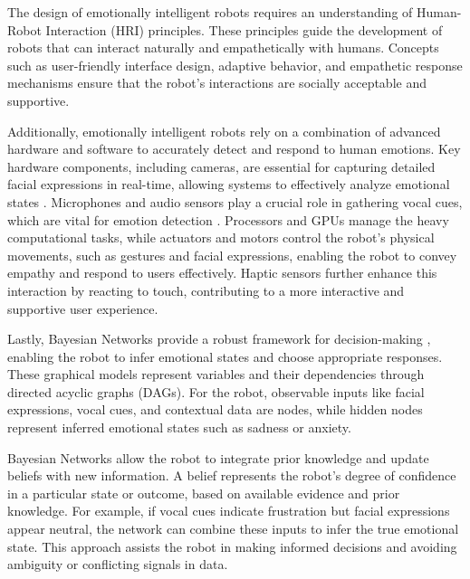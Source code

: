 The design of emotionally intelligent robots requires an understanding of Human-Robot Interaction (HRI) principles. These principles guide the development of robots that can interact naturally and empathetically with humans. Concepts such as user-friendly interface design, adaptive behavior, and empathetic response mechanisms ensure that the robot’s interactions are socially acceptable and supportive.

Additionally, emotionally intelligent robots rely on a combination of advanced hardware and software to accurately detect and respond to human emotions. Key hardware components, including cameras, are essential for capturing detailed facial expressions in real-time, allowing systems to effectively analyze emotional states \cite{gupta-2024}. Microphones and audio sensors play a crucial role in gathering vocal cues, which are vital for emotion detection \cite{10.48175/ijarsct-15385}. Processors and GPUs manage the heavy computational tasks, while actuators and motors control the robot’s physical movements, such as gestures and facial expressions, enabling the robot to convey empathy and respond to users effectively. Haptic sensors further enhance this interaction by reacting to touch, contributing to a more interactive and supportive user experience.

Lastly, Bayesian Networks provide a robust framework for decision-making \cite{DBLP:journals/corr/abs-2002-00269}, enabling the robot to infer emotional states and choose appropriate responses. These graphical models represent variables and their dependencies through directed acyclic graphs (DAGs). For the robot, observable inputs like facial expressions, vocal cues, and contextual data are nodes, while hidden nodes represent inferred emotional states such as sadness or anxiety.

Bayesian Networks allow the robot to integrate prior knowledge and update beliefs with new information. A belief represents the robot's degree of confidence in a particular state or outcome, based on available evidence and prior knowledge. For example, if vocal cues indicate frustration but facial expressions appear neutral, the network can combine these inputs to infer the true emotional state. This approach assists the robot in making informed decisions and avoiding ambiguity or conflicting signals in data.